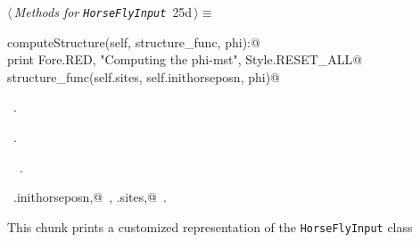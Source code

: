 \documentclass[11.5pt]{report}
\begin{document}
\vspace{-0.8cm}
\newchunk 
\begin{flushleft} \small\label{scrap32}\raggedright\small
{} $\langle\,${\itshape Methods for \verb|HorseFlyInput|}\nobreak\ {\footnotesize {25d}}$\,\rangle\equiv$
\vspace{-1ex}
\begin{list}{}{} \item
\mbox{}\verb@def  computeStructure(self, structure_func, phi):@\\
\mbox{}\verb@   print Fore.RED, "Computing the phi-mst", Style.RESET_ALL@\\
\mbox{}\verb@   structure_func(self.sites, self.inithorseposn, phi)@\\
\mbox{}\verb@@{\NWsep}
\end{list}
\vspace{-1.5ex}
\footnotesize
\begin{list}{}{\setlength{\itemsep}{-\parsep}\setlength{\itemindent}{-\leftmargin}}
\item \NWtxtMacroDefBy\ .
\item \NWtxtMacroRefIn\ .
\item \NWtxtIdentsDefed\nobreak\  \verb@computeStructure@\nobreak\ .\item \NWtxtIdentsUsed\nobreak\  \verb@self.inithorseposn,@\nobreak\ , \verb@self.sites,@\nobreak\ .
\item{}
\end{list}
\vspace{4ex}
\end{flushleft}

\vspace{-0.8cm} \newchunk This chunk prints a customized representation of the \verb|HorseFlyInput| class
\end{document}
